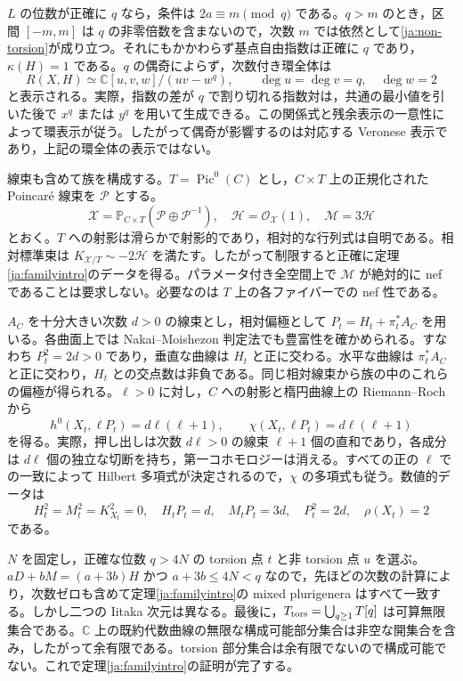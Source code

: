 \documentclass[12pt]{amsart}
\theoremstyle{definition}
\theoremstyle{remark}
\numberwithin{equation}{section}
\newcommand{\cO}{\mathcal{O}}
\newcommand{\cP}{\mathcal{P}}
\newcommand{\C}{\mathbb{C}}
\newcommand{\mP}{\mathbb{P}}
\DeclareMathOperator{\Pic}{Pic}
\begin{document}
$L$ の位数が正確に $q$ なら，条件は $2a\equiv m\pmod q$ である。$q>m$ のとき，区間 $[-m,m]$ は $q$ の非零倍数を含まないので，次数 $m$ では依然として\eqref{ja:non-torsion}が成り立つ。それにもかかわらず基点自由指数は正確に $q$ であり，$\kappa(H)=1$ である。$q$ の偶奇によらず，次数付き環全体は
\begin{equation}\label{ja:surface-ring}
 R(X,H)\simeq\C[u,v,w]/(uv-w^q),\qquad
 \deg u=\deg v=q,\quad\deg w=2
\end{equation}
と表示される。実際，指数の差が $q$ で割り切れる指数対は，共通の最小値を引いた後で $x^q$ または $y^q$ を用いて生成できる。この関係式と残余表示の一意性によって環表示が従う。したがって偶奇が影響するのは対応する Veronese 表示であり，上記の環全体の表示ではない。

線束も含めて族を構成する。$T=\Pic^0(C)$ とし，$C\times T$ 上の正規化された Poincar\'e 線束を $\cP$ とする。
\[
 \mathscr X=\mP_{C\times T}(\cP\oplus\cP^{-1}),\quad
 \mathscr H=\cO_{\mathscr X}(1),\quad \mathscr M=3\mathscr H
\]
とおく。$T$ への射影は滑らかで射影的であり，相対的な行列式は自明である。相対標準束は $K_{\mathscr X/T}\sim-2\mathscr H$ を満たす。したがって制限すると正確に定理\ref{ja:familyintro}のデータを得る。パラメータ付き全空間上で $\mathscr M$ が絶対的に nef であることは要求しない。必要なのは $T$ 上の各ファイバーでの nef 性である。

$A_C$ を十分大きい次数 $d>0$ の線束とし，相対偏極として $P_t=H_t+\pi_t^*A_C$ を用いる。各曲面上では Nakai--Moishezon 判定法でも豊富性を確かめられる。すなわち $P_t^2=2d>0$ であり，垂直な曲線は $H_t$ と正に交わる。水平な曲線は $\pi_t^*A_C$ と正に交わり，$H_t$ との交点数は非負である。同じ相対線束から族の中のこれらの偏極が得られる。$\ell>0$ に対し，$C$ への射影と楕円曲線上の Riemann--Roch から
\begin{equation}\label{ja:hilbert}
 h^0(X_t,\ell P_t)=d\ell(\ell+1),\qquad
 \chi(X_t,\ell P_t)=d\ell(\ell+1)
\end{equation}
を得る。実際，押し出しは次数 $d\ell>0$ の線束 $\ell+1$ 個の直和であり，各成分は $d\ell$ 個の独立な切断を持ち，第一コホモロジーは消える。すべての正の $\ell$ での一致によって Hilbert 多項式が決定されるので，$\chi$ の多項式も従う。数値的データは
\[
 H_t^2=M_t^2=K_{X_t}^2=0,\quad
 H_tP_t=d,\quad M_tP_t=3d,\quad P_t^2=2d,\quad\rho(X_t)=2
\]
である。

$N$ を固定し，正確な位数 $q>4N$ の torsion 点 $t$ と非 torsion 点 $u$ を選ぶ。$aD+bM=(a+3b)H$ かつ $a+3b\leq4N<q$ なので，先ほどの次数の計算により，次数ゼロも含めて定理\ref{ja:familyintro}の mixed plurigenera はすべて一致する。しかし二つの Iitaka 次元は異なる。最後に，$T_{\rm tors}=\bigcup_{q\geq1}T[q]$ は可算無限集合である。$\C$ 上の既約代数曲線の無限な構成可能部分集合は非空な開集合を含み，したがって余有限である。torsion 部分集合は余有限でないので構成可能でない。これで定理\ref{ja:familyintro}の証明が完了する。
\end{document}
